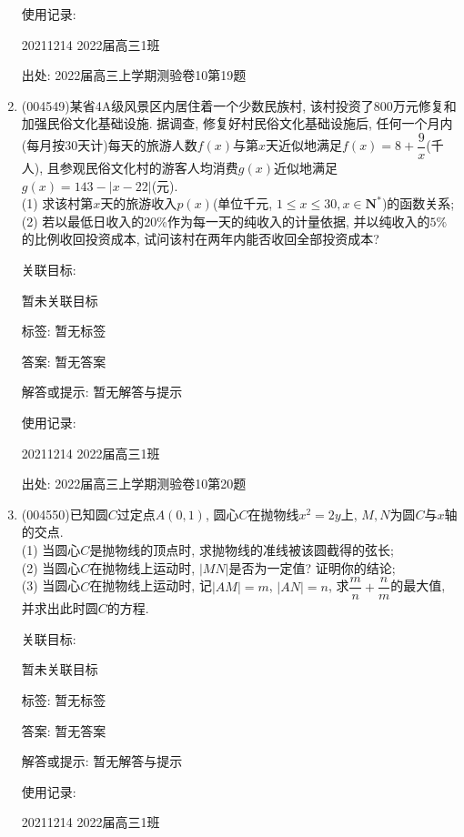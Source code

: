 \documentclass[10pt,a4paper]{article}
\begin{document}
\begin{enumerate}[1.]
使用记录:

20211214	2022届高三1班		


出处: 2022届高三上学期测验卷10第19题
\item { (004549)}某省4A级风景区内居住着一个少数民族村, 该村投资了$800$万元修复和加强民俗文化基础设施. 据调查, 修复好村民俗文化基础设施后, 任何一个月内(每月按$30$天计)每天的旅游人数$f(x)$与第$x$天近似地满足$f(x)=8+\dfrac 9x$(千人), 且参观民俗文化村的游客人均消费$g(x)$近似地满足$g(x)=143-|x-22|$(元).\\
(1) 求该村第$x$天的旅游收入$p(x)$(单位千元, $1\le x\le 30,x\in \mathbf{N}^*$)的函数关系;\\
(2) 若以最低日收入的$20\%$作为每一天的纯收入的计量依据, 并以纯收入的$5\%$的比例收回投资成本, 试问该村在两年内能否收回全部投资成本?


关联目标:

暂未关联目标



标签: 暂无标签

答案: 暂无答案

解答或提示: 暂无解答与提示

使用记录:

20211214	2022届高三1班			


出处: 2022届高三上学期测验卷10第20题
\item { (004550)}已知圆$C$过定点$A(0,1)$, 圆心$C$在抛物线$x^2=2y$上, $M,N$为圆$C$与$x$轴的交点.\\
(1) 当圆心$C$是抛物线的顶点时, 求抛物线的准线被该圆截得的弦长;\\
(2) 当圆心$C$在抛物线上运动时, $|MN|$是否为一定值? 证明你的结论;\\
(3) 当圆心$C$在抛物线上运动时, 记$|AM|=m$, $|AN|=n$, 求$\dfrac mn+\dfrac nm$的最大值, 并求出此时圆$C$的方程.


关联目标:

暂未关联目标



标签: 暂无标签

答案: 暂无答案

解答或提示: 暂无解答与提示

使用记录:

20211214	2022届高三1班			



\end{enumerate}
\end{document}
